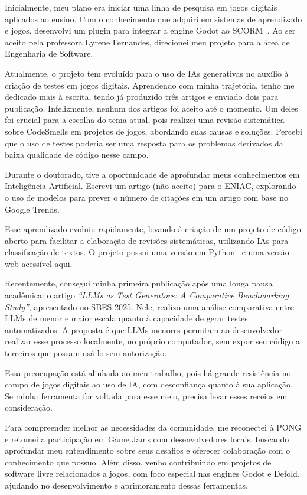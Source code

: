 \documentclass[10pt,a4paper,oneside]{book}
\begin{document}
Inicialmente, meu plano era iniciar uma linha de pesquisa em jogos digitais aplicados ao ensino. Com o conhecimento que
adquiri em sistemas de aprendizado e jogos, desenvolvi um plugin para integrar a engine Godot ao SCORM~\cite{godot_scorm}.
Ao ser aceito pela professora Lyrene Fernandes, direcionei meu projeto para a área de Engenharia de Software.

Atualmente, o projeto tem evoluído para o uso de IAs generativas no auxílio à criação de testes em jogos digitais.
Aprendendo com minha trajetória, tenho me dedicado mais à escrita, tendo já produzido três artigos e enviado dois para
publicação. Infelizmente, nenhum dos artigos foi aceito até o momento. Um deles foi crucial para a escolha do tema atual,
pois realizei uma revisão sistemática sobre CodeSmells em projetos de jogos, abordando suas causas e soluções. Percebi
que o uso de testes poderia ser uma resposta para os problemas derivados da baixa qualidade de código nesse campo.

Durante o doutorado, tive a oportunidade de aprofundar meus conhecimentos em Inteligência Artificial. Escrevi um artigo
(não aceito) para o ENIAC, explorando o uso de modelos para prever o número de citações em um artigo com base no Google
Trends.

Esse aprendizado evoluiu rapidamente, levando à criação de um projeto de código aberto para facilitar a elaboração de
revisões sistemáticas, utilizando IAs para classificação de textos. O projeto possui uma versão em
Python~\cite{sistematicreviem} e uma versão web acessível \href{https://esdrascaleb.github.io/websm/}{aqui}.

Recentemente, consegui minha primeira publicação após uma longa pausa acadêmica: o artigo
\textit{“LLMs as Test Generators: A Comparative Benchmarking Study”}, apresentado no SBES 2025.
Nele, realizo uma análise comparativa entre LLMs de menor e maior escala quanto à capacidade de gerar testes automatizados.
A proposta é que LLMs menores permitam ao desenvolvedor realizar esse processo localmente, no próprio computador,
sem expor seu código a terceiros que possam usá-lo sem autorização.


Essa preocupação está alinhada ao meu trabalho, pois há grande resistência no campo de jogos digitais ao uso de IA,
com desconfiança quanto à sua aplicação. Se minha ferramenta for voltada para esse meio,
precisa levar esses receios em consideração.

Para compreender melhor as necessidades da comunidade, me reconectei à PONG e retomei a participação em Game Jams com
desenvolvedores locais, buscando aprofundar meu entendimento sobre seus desafios e oferecer colaboração com o conhecimento que possuo.
Além disso, venho contribuindo em projetos de software livre relacionados a jogos, com foco especial nas engines Godot e Defold,
ajudando no desenvolvimento e aprimoramento dessas ferramentas.
\end{document}
